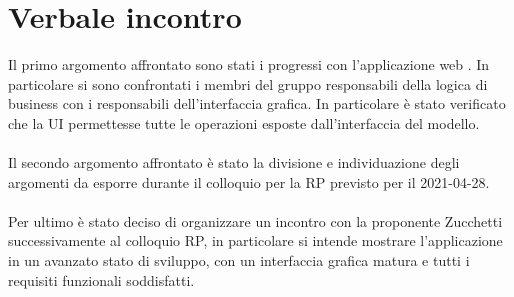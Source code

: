 \section{Verbale incontro}
Il primo argomento affrontato sono stati i progressi con l'applicazione web \hd . In particolare si sono confrontati i membri del gruppo responsabili della logica di business con i responsabili dell'interfaccia grafica. In particolare è stato verificato che la UI permettesse tutte le operazioni esposte dall'interfaccia del modello. \\ \\
\noindent Il secondo argomento affrontato è stato la divisione e individuazione degli argomenti da esporre durante il colloquio per la RP previsto per il 2021-04-28. \\ \\
\noindent Per ultimo è stato deciso di organizzare un incontro con la proponente Zucchetti successivamente al colloquio RP, in particolare si intende mostrare l'applicazione in un avanzato stato di sviluppo, con un interfaccia grafica matura e tutti i requisiti funzionali soddisfatti.